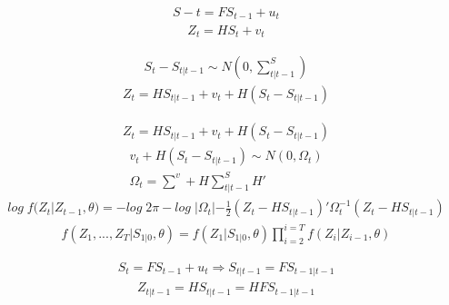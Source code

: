 \documentclass{beamer}
\begin{document}
\begin{frame}
  \begin{align}
    S-t=FS_{t-1} + u_t
  \end{align}
  \begin{align}
    Z_t= HS_t +v_t
  \end{align}
\end{frame}

\begin{frame}
  \begin{align}
    S_t-S_{t|t-1} \sim N (0,\scriptstyle \sum^S_{t|t-1})
  \end{align}
  \begin{align}
    Z_t=HS_{t|t-1}+v_t +H(S_t-S_{t|t-1})
  \end{align}
\end{frame}

\begin{frame}
  \begin{align}
    Z_t=HS_{t|t-1}+v_t +H(S_t-S_{t|t-1})
  \end{align}
  \begin{align}
    v_t + H(S_t-S_{t|t-1}) \sim N (0,\Omega_t)\\
    \Omega_t =\scriptstyle\sum^v +H\sum^S_{t|t-1}H'
  \end{align}
  \begin{align}
    log\;f(Z_t|Z_{t-1},\theta)= -log\; 2\pi -log\;|\Omega_t|-\frac{1}{2}(Z_t-HS_{t|t-1})'\Omega_t^{-1}(Z_t-HS_{t|t-1})
  \end{align}
  \begin{align}
    f(Z_1,...,Z_T|S_{1|0},\theta)=f(Z_1|S_{1|0},\theta)\prod_{i=2}^{i=T}f(Z_i|Z_{i-1},\theta)
  \end{align}
\end{frame}

\begin{frame}
  \begin{align}
    S_t=FS_{t-1}+u_t \Rightarrow S_{t|t-1}=FS_{t-1|t-1}
  \end{align}
  \begin{align}
    Z_{t|t-1}=HS_{t|t-1}=HFS_{t-1|t-1}
  \end{align}
\end{frame}
\end{document}
